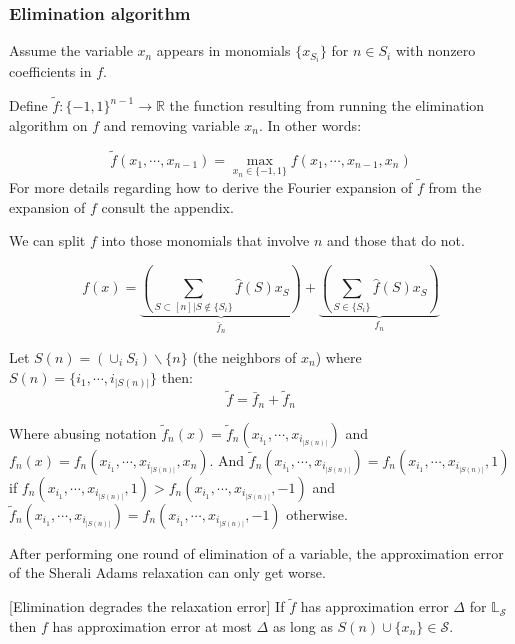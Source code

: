 

\subsubsection{ Elimination algorithm }

Assume the variable $x_n$ appears in monomials $\{x_{S_i}\}$ for $n \in S_i$ with nonzero coefficients in $f$.

Define $\tilde{f}:\{-1,1\}^{n-1} \rightarrow \mathbb{R}$ the function resulting from running the elimination algorithm on $f$ and removing variable $x_n$. In other words:

\begin{equation*}
\tilde{f}(x_1, \cdots, x_{n-1}) = \max_{x_n \in \{-1,1\}} f(x_1, \cdots, x_{n-1}, x_n)
\end{equation*}
For more details regarding how to derive the Fourier expansion of $\tilde{f}$ from the expansion of $f$ consult the appendix. 

We can split $f$ into those monomials that involve $n$ and those that do not.

\begin{equation*}
f(x) = \underbrace{\left(\sum_{S \subset [n] | S \not\in \{S_i\}} \hat{f}(S)x_S\right)}_{\bar{f}_n} + \underbrace{\left( \sum_{S \in \{S_i\}} \hat{f}(S)x_S\right)}_{f_n}
\end{equation*}

Let $S(n) = \left(\cup_i S_i\right) \backslash \{n\}$ (the neighbors of $x_n$) where $S(n) = \{i_1, \cdots, i_{|S(n)|}\}$ then:
\begin{equation}
\tilde{f} = \bar{f}_n + \tilde{f}_n
\end{equation}

Where abusing notation $\tilde{f}_n(x) = \tilde{f}_n(x_{i_1}, \cdots, x_{i_{|S(n)|}})$ and $f_n(x) = f_n(x_{i_1}, \cdots, x_{i_{|S(n)|}}, x_n)$. And $\tilde{f}_n(x_{i_1}, \cdots, x_{i_{|S(n)|}}) = f_n(x_{i_1}, \cdots, x_{i_{|S(n)|}}, 1)$ if $f_n(x_{i_1}, \cdots, x_{i_{|S(n)|}}, 1)  > f_n(x_{i_1}, \cdots, x_{i_{|S(n)|}}, -1)$ and  $\tilde{f}_n(x_{i_1}, \cdots, x_{i_{|S(n)|}}) = f_n(x_{i_1}, \cdots, x_{i_{|S(n)|}}, -1)$ otherwise.

After performing one round of elimination of a variable, the approximation error of the Sherali Adams relaxation can only get worse.

\begin{lemma}\label{elimination_degrades}[Elimination degrades the relaxation error]
If $\tilde{f}$ has approximation error $\Delta$ for $\mathbb{L}_{\mathcal{S}}$ then $f$ has approximation error at most $\Delta$ as long as $S(n) \cup\{x_n\} \in \mathcal{S}$.
\end{lemma}

